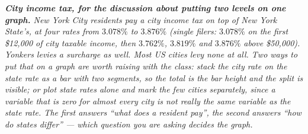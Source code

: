 \documentclass[12pt, twoside]{article}
\begin{document}
\begin{enumerate}[itemsep=0.3cm]
\emph{\textbf{City income tax, for the discussion about putting two levels on
one graph.} New York City residents pay a city income tax on top of New York
State's, at four rates from $3.078\%$ to $3.876\%$ (single filers: $3.078\%$ on
the first \$12{,}000 of city taxable income, then $3.762\%$, $3.819\%$ and
$3.876\%$ above \$50{,}000). Yonkers levies a surcharge as well. Most US cities
levy none at all. Two ways to put that on a graph are worth raising with the
class: stack the city rate on the state rate as a bar with two segments, so the
total is the bar height and the split is visible; or plot state rates alone and
mark the few cities separately, since a variable that is zero for almost every
city is not really the same variable as the state rate. The first answers ``what
does a resident pay'', the second answers ``how do states differ'' --- which
question you are asking decides the graph.}

\end{enumerate}
\end{document}
